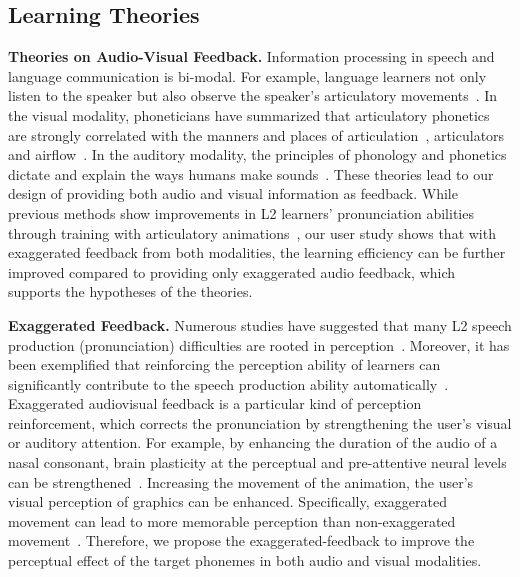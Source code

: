 \documentclass[sigconf]{acmart}
\begin{document}
\subsection{Learning Theories}
\label{sec:2.1}
\textbf{Theories on Audio-Visual Feedback.}
Information processing in speech and language communication is bi-modal. For example, language learners not only listen to the speaker but also observe the speaker's articulatory movements~\cite{king1985integration, chen1998audio}. In the visual modality, phoneticians have summarized that articulatory phonetics are strongly correlated with the manners and places of articulation~\cite{halle2000feature,titze1998principles,ogden2017introduction,crystal2011dictionary}, articulators~\cite{kelly2006teach} and airflow~\cite{geoghegan2012stereoscopic}. In the auditory modality, the principles of phonology and phonetics dictate and explain the ways humans make sounds~\cite{rogerson2011english,trubetzkoy1969principles,pierrehumbert1980phonology}. These theories lead to our design of providing both audio and visual information as feedback. While previous methods show improvements in L2 learners’ pronunciation abilities through training with articulatory animations~\cite{bliss2018computer,kartushina2015effect}, our user study shows that with exaggerated feedback from both modalities, the learning efficiency can be further improved compared to providing only exaggerated audio feedback, which supports the hypotheses of the theories.


\noindent\textbf{Exaggerated Feedback.}
Numerous studies have suggested that many L2 speech production (pronunciation) difficulties are rooted in perception~\cite{meng2007deriving, escudero2001role, escudero2005linguistic, ricard1986beyond, colantoni2015second}. Moreover, it has been exemplified that reinforcing the perception ability of learners can significantly contribute to the speech production ability automatically~\cite{bu2020visual,ortega1999enhancing, strange2008speech, lee2016effects, bradlow1997training, lee2020effects}. Exaggerated audiovisual feedback is a particular kind of perception reinforcement, which corrects the pronunciation by strengthening the user's visual or auditory attention. For example, by enhancing the duration of the audio of a nasal consonant, brain plasticity at the perceptual and pre-attentive neural levels can be strengthened~\cite{cheng2019temporal, cheng2019role}. Increasing the movement of the animation, the user's visual perception of graphics can be enhanced. Specifically, exaggerated movement can lead to more memorable perception than non-exaggerated movement~\cite{granqvist2018exaggeration}. Therefore, we propose the exaggerated-feedback to improve the perceptual effect of the target phonemes in both audio and visual modalities. 
\end{document}
